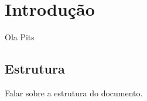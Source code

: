\chapter{Introdução}\label{chp:intro}
Ola Pits \cite{Pitts2013}


\section{Estrutura}
Falar sobre a estrutura do documento.
